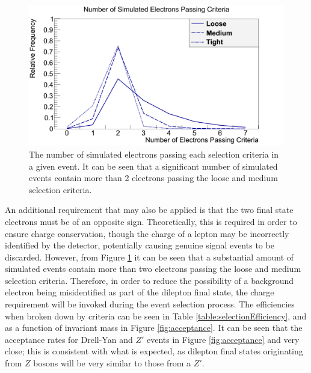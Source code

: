 \documentclass{article}
\begin{document}



\begin{figure}[h]
    \centering
    \includegraphics[scale=0.3]{images/nEl.png}
    \caption{The number of simulated electrons passing each selection criteria in a given event. It can be seen that a significant number of simulated events contain more than 2 electrons passing the loose and medium selection criteria. \label{fig:nEl}}
\end{figure}

An additional requirement that may also be applied is that the two final state electrons must be of an opposite sign. Theoretically, this is required in order to ensure charge conservation, though the charge of a lepton may be incorrectly identified by the detector, potentially causing genuine signal events to be discarded. However, from Figure \ref{fig:nEl} it can be seen that a substantial amount of simulated events contain more than two electrons passing the loose and medium selection criteria. Therefore, in order to reduce the possibility of a background electron being misidentified as part of the dilepton final state, the charge requirement will be  invoked during the event selection process. The efficiencies when broken down by criteria can be seen in Table \ref{table:selectionEfficiency}, and as a function of invariant mass in Figure \ref{fig:acceptance}. It can be seen that the acceptance rates for Drell-Yan and $Z'$ events in Figure \ref{fig:acceptance} and very close; this is consistent with what is expected, as dilepton final states originating from $Z$ bosons will be very similar to those from a $Z'$.
\end{document}
